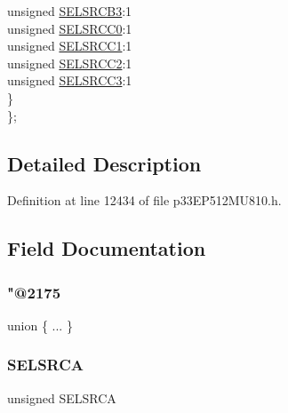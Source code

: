 \begin{DoxyCompactItemize}
\begin{tabbing}
\>\>unsigned \hyperlink{structtag_c_m2_m_s_k_s_r_c_b_i_t_s_add54534d44de4b82fdc84f84aa070f45}{SELSRCB3}:1\\
\>\>unsigned \hyperlink{structtag_c_m2_m_s_k_s_r_c_b_i_t_s_a695ed39b349ba556d685ef7fc3ab9f19}{SELSRCC0}:1\\
\>\>unsigned \hyperlink{structtag_c_m2_m_s_k_s_r_c_b_i_t_s_a5b873921176d73d0048f77a7230211c3}{SELSRCC1}:1\\
\>\>unsigned \hyperlink{structtag_c_m2_m_s_k_s_r_c_b_i_t_s_a7cf665e6530692c6a4905ad1e53934ad}{SELSRCC2}:1\\
\>\>unsigned \hyperlink{structtag_c_m2_m_s_k_s_r_c_b_i_t_s_a232ce18f72b62eef1f6ac40a0c4b7f31}{SELSRCC3}:1\\
\>\} \\
\}; \\

\end{tabbing}\end{DoxyCompactItemize}


\subsection{Detailed Description}


Definition at line 12434 of file p33\+E\+P512\+M\+U810.\+h.



\subsection{Field Documentation}
\mbox{\label{structtag_c_m2_m_s_k_s_r_c_b_i_t_s_af73bb53a9ae447a897dd4046e6932430}} 
\subsubsection{\texorpdfstring{"@2175}{@2175}}
{\footnotesize\ttfamily union \{ ... \} }

\mbox{\label{structtag_c_m2_m_s_k_s_r_c_b_i_t_s_a71efbbcc07c5589abbdc8fbc64bb43b7}} 
\subsubsection{\texorpdfstring{S\+E\+L\+S\+R\+CA}{SELSRCA}}
{\footnotesize\ttfamily unsigned S\+E\+L\+S\+R\+CA}



